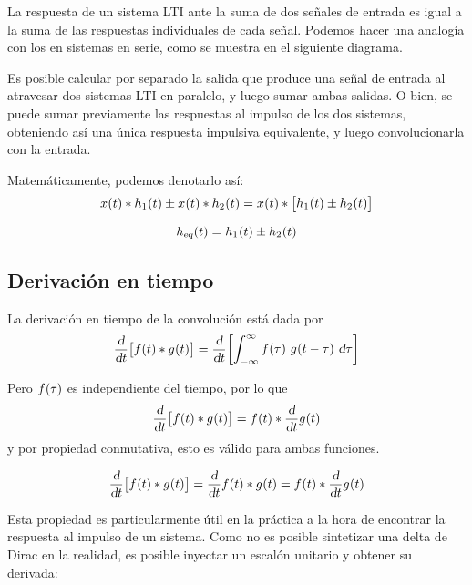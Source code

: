 La respuesta de un sistema LTI ante la suma de dos señales de entrada es igual a la suma de las respuestas individuales de cada señal.
Podemos hacer una analogía con los en sistemas en serie, como se muestra en el siguiente diagrama.

\begin{center}
    \def\svgwidth{0.8\linewidth}
    
\end{center}

Es posible calcular por separado la salida que produce una señal de entrada al atravesar dos sistemas LTI en paralelo, y luego sumar ambas salidas.
O bien, se puede sumar previamente las respuestas al impulso de los dos sistemas, obteniendo así una única respuesta impulsiva equivalente, y luego convolucionarla con la entrada.

Matemáticamente, podemos denotarlo así:
\[
    \fx[x]{t} * \fx[h_1]{t} \pm \fx[x]{t} * \fx[h_2]{t}
    = \fx[x]{t} * \inBrackets{\fx[h_1]{t} \pm \fx[h_2]{t}}
\]

\begin{mdframed}[style=PropertyFrame]
    \begin{prop}
    \end{prop}
    \[
        \fx[\sub{h}{eq}]{t} = \fx[h_1]{t} \pm \fx[h_2]{t}
    \]
\end{mdframed}

\subsection{Derivación en tiempo}

La derivación en tiempo de la convolución está dada por
\[
    \deriv{t} \inBrackets{\fx[f]{t} * \fx[g]{t}} = \deriv{t} \inBrackets{\convol[g]{f}}
\]

Pero $\fx[f]{\tau}$ es independiente del tiempo, por lo que
\[
    \deriv{t} \inBrackets{\fx[f]{t} * \fx[g]{t}}
    = \fx[f]{t} * \deriv{t} \fx[g]{t}
\]
y por propiedad conmutativa, esto es válido para ambas funciones.

\begin{mdframed}[style=PropertyFrame]
    \begin{prop}
    \end{prop}
    \[
        \deriv{t} \inBrackets{\fx[f]{t} * \fx[g]{t}}
        = \deriv{t} \fx[f]{t} * \fx[g]{t}
        = \fx[f]{t} * \deriv{t} \fx[g]{t}
    \]
\end{mdframed}

Esta propiedad es particularmente útil en la práctica a la hora de encontrar la respuesta al impulso de un sistema.
Como no es posible sintetizar una delta de Dirac en la realidad, es posible inyectar un escalón unitario y obtener su derivada:

